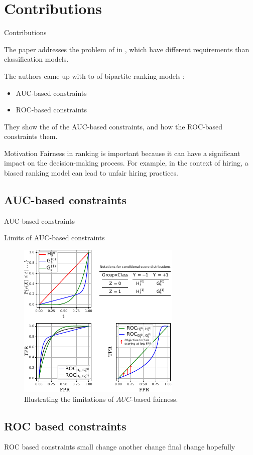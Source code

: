 \section{Contributions}
\begin{frame}{Contributions}

    The paper addresses the problem of  in , which have different requirements than classification models.
    
    The authors came up with  to  of bipartite ranking models :
  \begin{itemize}
      \item AUC-based constraints
      \item ROC-based constraints
  \end{itemize}
  
  They show the  of the AUC-based constraints, and how the ROC-based constraints  them.
\end{frame}

\begin{frame}{Motivation}
    Fairness in ranking is important because it can have a significant impact on the decision-making process. For example, in the context of hiring, a biased ranking model can lead to unfair hiring practices.
\end{frame}


\subsection{AUC-based constraints}
\begin{frame}{AUC-based constraints}

\end{frame}

\begin{frame}{Limits of AUC-based constraints}
    \begin{figure}[t]
        \centering
        \includegraphics[width=0.6\columnwidth]{images/original_paper/example_simple_dists_explained_with_table2.pdf}
        \caption{Illustrating the limitations of $AUC$-based fairness.}
        \label{fig:example-1}
    \end{figure}
\end{frame}

\subsection{ROC based constraints}
\begin{frame}{ROC based constraints}
    small change another change final change hopefully
\end{frame}
